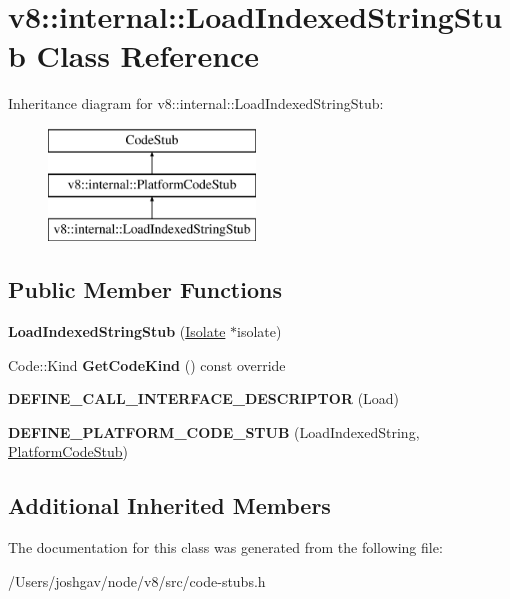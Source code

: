 \hypertarget{classv8_1_1internal_1_1_load_indexed_string_stub}{}\section{v8\+:\+:internal\+:\+:Load\+Indexed\+String\+Stub Class Reference}
\label{classv8_1_1internal_1_1_load_indexed_string_stub}
Inheritance diagram for v8\+:\+:internal\+:\+:Load\+Indexed\+String\+Stub\+:\begin{figure}[H]
\begin{center}
\leavevmode
\includegraphics[height=3.000000cm]{classv8_1_1internal_1_1_load_indexed_string_stub}
\end{center}
\end{figure}
\subsection*{Public Member Functions}
\begin{DoxyCompactItemize}
\item 
{\bfseries Load\+Indexed\+String\+Stub} (\hyperlink{classv8_1_1internal_1_1_isolate}{Isolate} $\ast$isolate)\hypertarget{classv8_1_1internal_1_1_load_indexed_string_stub_a4f6b77cf2abd5aae3136d4c77915bc3a}{}\label{classv8_1_1internal_1_1_load_indexed_string_stub_a4f6b77cf2abd5aae3136d4c77915bc3a}

\item 
Code\+::\+Kind {\bfseries Get\+Code\+Kind} () const  override\hypertarget{classv8_1_1internal_1_1_load_indexed_string_stub_aa5082593561caaf10218504bfe0a8baf}{}\label{classv8_1_1internal_1_1_load_indexed_string_stub_aa5082593561caaf10218504bfe0a8baf}

\item 
{\bfseries D\+E\+F\+I\+N\+E\+\_\+\+C\+A\+L\+L\+\_\+\+I\+N\+T\+E\+R\+F\+A\+C\+E\+\_\+\+D\+E\+S\+C\+R\+I\+P\+T\+OR} (Load)\hypertarget{classv8_1_1internal_1_1_load_indexed_string_stub_ae3bfc7fb63020f2bed1fb064bdd06fae}{}\label{classv8_1_1internal_1_1_load_indexed_string_stub_ae3bfc7fb63020f2bed1fb064bdd06fae}

\item 
{\bfseries D\+E\+F\+I\+N\+E\+\_\+\+P\+L\+A\+T\+F\+O\+R\+M\+\_\+\+C\+O\+D\+E\+\_\+\+S\+T\+UB} (Load\+Indexed\+String, \hyperlink{classv8_1_1internal_1_1_platform_code_stub}{Platform\+Code\+Stub})\hypertarget{classv8_1_1internal_1_1_load_indexed_string_stub_a590800730f33539f3e590477011942ad}{}\label{classv8_1_1internal_1_1_load_indexed_string_stub_a590800730f33539f3e590477011942ad}

\end{DoxyCompactItemize}
\subsection*{Additional Inherited Members}


The documentation for this class was generated from the following file\+:\begin{DoxyCompactItemize}
\item 
/\+Users/joshgav/node/v8/src/code-\/stubs.\+h\end{DoxyCompactItemize}
